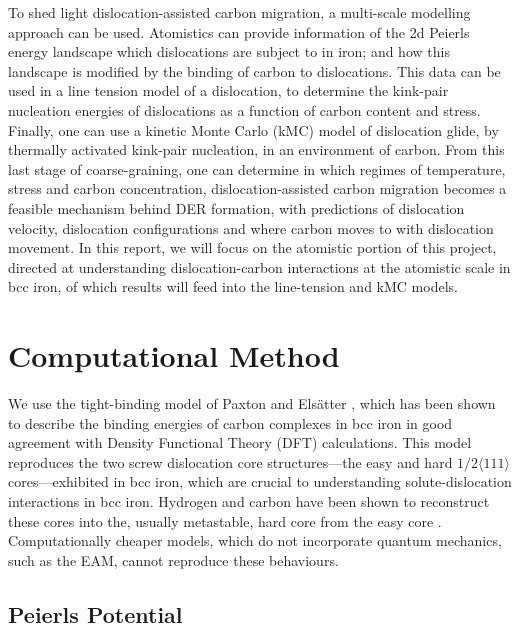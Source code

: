 \documentclass[a4paper,11pt]{article}
\begin{document}
To shed light dislocation-assisted carbon migration, a multi-scale modelling approach can be
used. Atomistics can provide information of the 2d Peierls energy landscape which dislocations are
subject to in iron; and how this landscape is modified by the binding of carbon to
dislocations. This data can be used in a line tension model of a dislocation, to determine the
kink-pair nucleation energies of dislocations as a function of carbon content and stress. Finally,
one can use a kinetic Monte Carlo (kMC) model of dislocation glide, by thermally activated kink-pair
nucleation, in an environment of carbon. From this last stage of coarse-graining, one can
determine in which regimes of temperature, stress and carbon concentration, dislocation-assisted
carbon migration becomes a feasible mechanism behind DER formation, with predictions of
dislocation velocity, dislocation configurations and where carbon moves to with dislocation
movement. In this report, we will focus on the atomistic portion of this project, directed at
understanding dislocation-carbon interactions at the atomistic scale in bcc iron, of which results will feed
into the line-tension and kMC models.







\section{Computational Method}
\label{sec:org94ada21}

We use the tight-binding model of Paxton and Elsätter \cite{Paxton2013}, which has been shown to
describe the binding energies of carbon complexes in bcc iron in good agreement with Density
Functional Theory (DFT) calculations. This model reproduces the two screw dislocation core
structures---the easy and hard \(1/2\langle 111 \rangle\) cores---exhibited in bcc iron, which are crucial to
understanding solute-dislocation interactions in bcc iron. Hydrogen and carbon have been shown to
reconstruct these cores into the, usually metastable, hard core from the easy core
\cite{Ventelon2015,itakura13_effec_hydrog_atoms_screw_disloc}. Computationally cheaper models, which
do not incorporate quantum mechanics, such as the EAM, cannot reproduce these behaviours.

\subsection{Peierls Potential}
\label{sec:org187688a}
\end{document}
